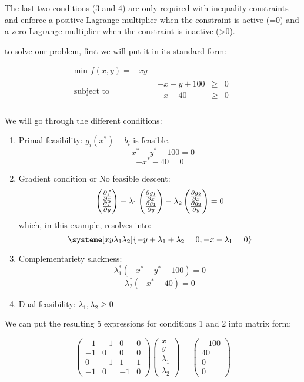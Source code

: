 The last two conditions (3 and 4) are only required with inequality constraints and enforce a positive Lagrange multiplier when the constraint is active (=0) and a zero Lagrange multiplier when the constraint is inactive (>0). 

to solve our problem, first we will put it in its standard form:


\begin{equation*}
  \begin{aligned}
    \text{min } f(x,y)=-xy \\
    \text{subject to }\quad &
    \begin{array}{rcl}
      -x-y+100  & \geq & 0  \\
      -x-40 & \geq & 0  \\
    \end{array}
  \end{aligned}
\end{equation*}

We will go through the different conditions:

\begin{enumerate}
  \item Primal feasibility:  $g_i(x^*)-b_i$ is feasible. 
  \[-x^* -y^* +100 =0\]
  \[-x^*-40=0\]
  \item Gradient condition or No feasible descent:  
  \[ \begin{pmatrix}\pdv{f}{x}\\\pdv{f}{y}\end{pmatrix} 
  -\lambda_1 \begin{pmatrix}\pdv{g_1}{x}\\\pdv{g_1}{y}\end{pmatrix}
  -\lambda_2 \begin{pmatrix}\pdv{g_2}{x}\\\pdv{g_2}{y}\end{pmatrix} =0\]
  which, in this example, resolves into:
  \[\systeme[xy\lambda_1\lambda_2]{-y+\lambda_1+\lambda_2=0,-x-\lambda_1=0 }\]
  \item Complementariety slackness: 
  \[\lambda_1^* (-x^* -y^* +100)=0\]
  \[\lambda_2^* (-x^*-40)=0\]
  \item Dual feasibility: $\lambda_1,\lambda_2\geq 0$
\end{enumerate}

We can put the resulting 5 expressions for conditions 1 and 2 into matrix form:

\[
  \begin{pmatrix} -1 & -1 & 0&0\\ -1&0&0&0\\ 0&-1&1&1\\ -1&0&-1&0 \end{pmatrix}
  \begin{pmatrix} x\\y\\\lambda_1\\\lambda_2\end{pmatrix}=
  \begin{pmatrix} -100\\ 40\\0\\0 \end{pmatrix}
\]

